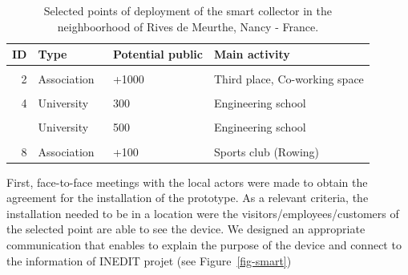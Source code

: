 \documentclass[
  11pt,
]{article}
\begin{document}
\hypertarget{tbl-deployment}{}
\begin{table}[H]
\caption{\label{tbl-deployment}Selected points of deployment of the smart collector in the
neighboorhood of Rives de Meurthe, Nancy - France. }\tabularnewline

\centering\begingroup\fontsize{10}{12}\selectfont

\begin{tabular}[t]{r>{\raggedright\arraybackslash}p{3cm}l>{\raggedright\arraybackslash}p{5cm}}
\toprule
ID & Type​ & Potential public​ & Main activity\\
\midrule
\cellcolor{gray!6}{1} & \cellcolor{gray!6}{Association​ } & \cellcolor{gray!6}{+300​ } & \cellcolor{gray!6}{Cultural/leisure activities}\\
2 & Association ​  & +1000​  & Third place, Co-working space\\
\cellcolor{gray!6}{3} & \cellcolor{gray!6}{Private Entreprise​ } & \cellcolor{gray!6}{+100​ } & \cellcolor{gray!6}{Sport Gym}\\
4 & University  & 300​  & Engineering school\\
\cellcolor{gray!6}{5} & \cellcolor{gray!6}{Private Enterprise} & \cellcolor{gray!6}{50​ } & \cellcolor{gray!6}{Mutual Insurance}\\
\addlinespace
6 & University  & 500​  & Engineering school\\
\cellcolor{gray!6}{7} & \cellcolor{gray!6}{Public Entreprise​ } & \cellcolor{gray!6}{50​ } & \cellcolor{gray!6}{Management of waterrways network}\\
8 & Association​  & +100​  & Sports club (Rowing)\\
\bottomrule
\end{tabular}
\endgroup{}
\end{table}

First, face-to-face meetings with the local actors were made to obtain
the agreement for the installation of the prototype. As a relevant
criteria, the installation needed to be in a location were the
visitors/employees/customers of the selected point are able to see the
device. We designed an appropriate communication that enables to explain
the purpose of the device and connect to the information of INEDIT
projet (see Figure~\ref{fig-smart})
\end{document}
